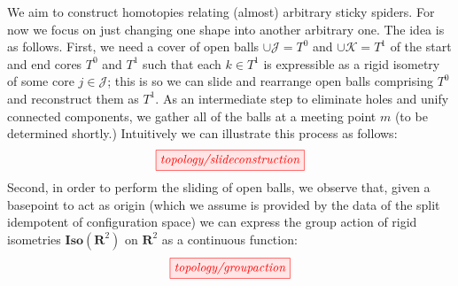 \begin{myboxB}
\begin{construction}\label{cons:morph}
We aim to construct homotopies relating (almost) arbitrary sticky spiders. For now we focus on just changing one shape into another arbitrary one. The idea is as follows. First, we need a cover of open balls $\cup\mathcal{J} = T^0$ and $\cup\mathcal{K} = T^1$ of the start and end cores $T^0$ and $T^1$ such that each $k \in T^1$ is expressible as a rigid isometry of some core $j \in \mathcal{J}$; this is so we can slide and rearrange open balls comprising $T^0$ and reconstruct them as $T^1$. As an intermediate step to eliminate holes and unify connected components, we gather all of the balls at a meeting point $m$ (to be determined shortly.) Intuitively we can illustrate this process as follows:
\[\tikzfig{topology/slideconstruction}\]
Second, in order to perform the sliding of open balls, we observe that, given a basepoint to act as origin (which we assume is provided by the data of the split idempotent of configuration space) we can express the group action of rigid isometries $\mathbf{Iso}(\mathbf{R}^2)$ on $\mathbf{R}^2$ as a continuous function:
\[\tikzfig{topology/groupaction}\]
\end{construction}
\end{myboxB}

